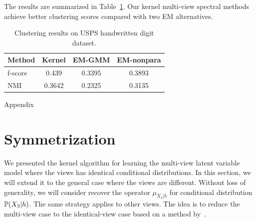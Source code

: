 \documentclass{article}
\begin{document}
The results are summarized in Table~\ref{tbl:usps}. Our kernel multi-view spectral methods achieve better clustering scores compared with two EM alternatives. 

\begin{table}
{\centering
\begin{tabular}{l|ccc}
\hline
Method & Kernel & EM-GMM & EM-nonpara \\
\hline
f-score & 0.439 & 0.3395 & 0.3893 \\
\hline
NMI & 0.3642 & 0.2325 & 0.3135 \\
\hline
\end{tabular}
\caption{Clustering results on USPS handwritten digit dataset.}
\label{tbl:usps}}
\end{table}


\clearpage
\newpage




\clearpage
\newpage

\onecolumn

\begin{center}
{\Large Appendix}
\end{center}

\section{Symmetrization}
\label{sec:symmetrization}

We presented the kernel algorithm for learning the multi-view latent variable model where the views has identical conditional distributions. In this section, we will extend it to the general case where the views are different. Without loss of generality, we will consider recover the operator $\mu_{X_3|h}$ for conditional distribution $\mathbb{P}(X_3|h)$. The same strategy applies to other views. The idea is to reduce the multi-view case to the identical-view case based on a method by~\cite{AnandkumarEtal:twosvd12}.
\end{document}
